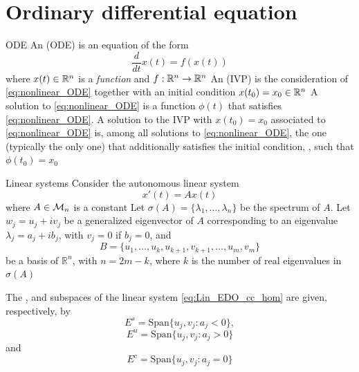 \documentclass[aspectratio=169]{beamer}
\begin{document}
\section{Ordinary differential equation}

\begin{frame}{ODE}
An  (ODE) is an equation of the form 
\begin{equation}\label{eq:nonlinear_ODE}
\dfrac{d}{dt}x(t)= f(x(t))
\end{equation}
where $x(t)\in \mathbb{R}^n$ is a \emph{function} and $f:\mathbb{R}^n \to \mathbb{R}^n$
\vfill
An  (IVP) is the consideration of \eqref{eq:nonlinear_ODE} together with an initial condition $x(t_0)=x_0\in\mathbb{R}^n$
\vfill
A solution to \eqref{eq:nonlinear_ODE} is a function $\phi(t)$ that satisfies \eqref{eq:nonlinear_ODE}. A solution to the IVP with $x(t_0)=x_0$ associated to \eqref{eq:nonlinear_ODE} is, among all solutions to \eqref{eq:nonlinear_ODE}, the one (typically the only one) that additionally satisfies the initial condition, \ie, such that $\phi(t_0)=x_0$
\end{frame}

\begin{frame}{Linear systems}
Consider the autonomous linear system
\begin{equation}\label{eq:Lin_EDO_cc_hom}
x'(t)=Ax(t)
\end{equation}
where $A\in\mathcal{M}_n$ is a constant
\vfill
Let $\sigma(A)=\{\lambda_1,\ldots,\lambda_n\}$ be the spectrum of $A$.
Let $w_j=u_j+iv_j$ be a generalized eigenvector of $A$ corresponding to an eigenvalue $\lambda_j=a_j+ib_j$, with $v_j=0$ if $b_j=0$, and 
\[
B=\{u_1,\ldots,u_k,u_{k+1},v_{k+1},\ldots,u_m,v_m\}
\]
be a basis of $\mathbb{R}^n$, with $n=2m-k$, where $k$ is the number of real eigenvalues in $\sigma(A)$
\end{frame}

\begin{frame}
\begin{definition}
The ,  and  subspaces of the linear system \eqref{eq:Lin_EDO_cc_hom} are given, respectively, by
\[
E^s=\textrm{Span}\{u_j,v_j:a_j<0\},
\]
\[
E^u=\textrm{Span}\{u_j,v_j:a_j>0\}
\]
and
\[
E^c=\textrm{Span}\{u_j,v_j:a_j=0\}
\]
\end{definition}
\end{frame}
\end{document}
